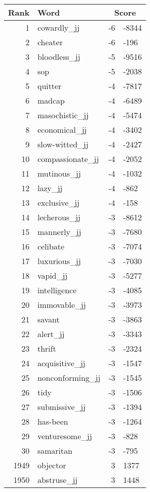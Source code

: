 \begin{longtable}[!htbp]{| rlr@{.}l |}
    \hline
    \textbf{Rank} & \textbf{Word} & \multicolumn{2}{c|}{\textbf{Score}} \\
    \hline
    \endhead
    1 & cowardly\_jj & -6 & -8344 \\
    2 & cheater & -6 & -196 \\
    3 & bloodless\_jj & -5 & -9516 \\
    4 & sop & -5 & -2038 \\
    5 & quitter & -4 & -7817 \\
    6 & madcap & -4 & -6489 \\
    7 & masochistic\_jj & -4 & -5474 \\
    8 & economical\_jj & -4 & -3402 \\
    9 & slow-witted\_jj & -4 & -2427 \\
    10 & compassionate\_jj & -4 & -2052 \\
    11 & mutinous\_jj & -4 & -1032 \\
    12 & lazy\_jj & -4 & -862 \\
    13 & exclusive\_jj & -4 & -158 \\
    14 & lecherous\_jj & -3 & -8612 \\
    15 & mannerly\_jj & -3 & -7680 \\
    16 & celibate & -3 & -7074 \\
    17 & luxurious\_jj & -3 & -7030 \\
    18 & vapid\_jj & -3 & -5277 \\
    19 & intelligence & -3 & -4085 \\
    20 & immovable\_jj & -3 & -3973 \\
    21 & savant & -3 & -3863 \\
    22 & alert\_jj & -3 & -3343 \\
    23 & thrift & -3 & -2324 \\
    24 & acquisitive\_jj & -3 & -1547 \\
    25 & nonconforming\_jj & -3 & -1545 \\
    26 & tidy & -3 & -1506 \\
    27 & submissive\_jj & -3 & -1394 \\
    28 & has-been & -3 & -1264 \\
    29 & venturesome\_jj & -3 & -828 \\
    30 & samaritan & -3 & -795 \\
    1949 & objector & 3 & 1377 \\
    1950 & abstruse\_jj & 3 & 1448 \\

\end{longtable}
